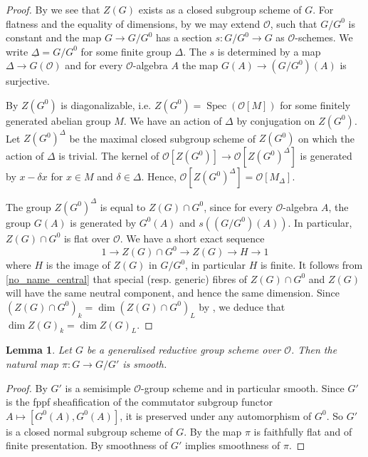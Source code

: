 \documentclass{amsart}
\newtheorem{lem}[prop]{Lemma}
\theoremstyle{definition}
\theoremstyle{remark}
\DeclareMathOperator{\Spec}{Spec}
\newcommand{\OO}{\mathcal O}
\begin{document}
\begin{proof}
    By  we see that $Z(G)$ exists as a closed subgroup scheme of $G$.
    For flatness and the equality of dimensions, by  we may extend $\OO$, such that $G/G^0$ is constant and the map $G \to G/G^0$ has a section $s : G/G^0 \to G$ as $\OO$-schemes.
    We write $\underline\Delta = G/G^0$ for some finite group $\Delta$.
    The $s$ is determined by a map $\Delta \to G(\OO)$ and for every $\OO$-algebra $A$ the map $G(A) \to (G/G^0)(A)$ is surjective.

    By \cite[Theorem 3.3.4]{bcnrd} $Z(G^0)$ is diagonalizable, i.e. $Z(G^0) = \Spec(\OO[M])$ for some finitely generated abelian group $M$. We have an action of $\Delta$ by conjugation on $Z(G^0)$. 
    Let $Z(G^0)^{\Delta}$ be the maximal closed subgroup scheme of $Z(G^0)$ on which the action of $\Delta$ is trivial.
    The kernel of $\OO[Z(G^0)] \to \OO[Z(G^0)^{\Delta}]$ is generated by $x - \delta x$ for $x \in M$ and $\delta \in \Delta$.
    Hence, $\OO[Z(G^0)^{\Delta}] = \OO[M_{\Delta}]$.
    
    The group $Z(G^0)^{\Delta}$ is equal to $Z(G) \cap G^0$, since for every $\OO$-algebra $A$, the group $G(A)$ is generated by $G^0(A)$ and $s((G/G^0)(A))$.
    In particular, $Z(G) \cap G^0$ is flat over $\OO$. We have a short exact sequence
    \begin{equation}\label{no_name_central}
     1 \to Z(G) \cap G^0 \to Z(G) \to H \to 1 
     \end{equation}
    where $H$ is the image of $Z(G)$ in $G/G^0$, in particular $H$ is finite.  It follows from \eqref{no_name_central} that special (resp. generic) 
    fibres of $Z(G) \cap G^0$ and $Z(G)$ will have the same 
    neutral component, and hence the same dimension. Since
     $(Z(G) \cap G^0)_k = \dim (Z(G) \cap G^0)_L$ by ,  we deduce that 
    $\dim Z(G)_k = \dim Z(G)_L$.
    \end{proof}

\begin{lem}\label{smooth_projection}
    Let $G$ be a generalised reductive group scheme over $\OO$. Then the natural map $\pi : G \to G/G'$ is smooth.
\end{lem}

\begin{proof}
    By \cite[Theorem 5.3.1]{bcnrd} $G'$ is a semisimple $\OO$-group scheme and in particular smooth.
    Since $G'$ is the fppf sheafification of the commutator subgroup functor $A \mapsto [G^0(A), G^0(A)]$, it is preserved under any automorphism of $G^0$.
    So $G'$ is a closed normal subgroup scheme of $G$.
    By  the map $\pi$ is faithfully flat and of finite presentation.
    By \cite[Expos\'e VIB, Proposition 9.2 (vii)]{SGA3_new} smoothness of $G'$ implies smoothness of $\pi$.
\end{proof}
\end{document}
